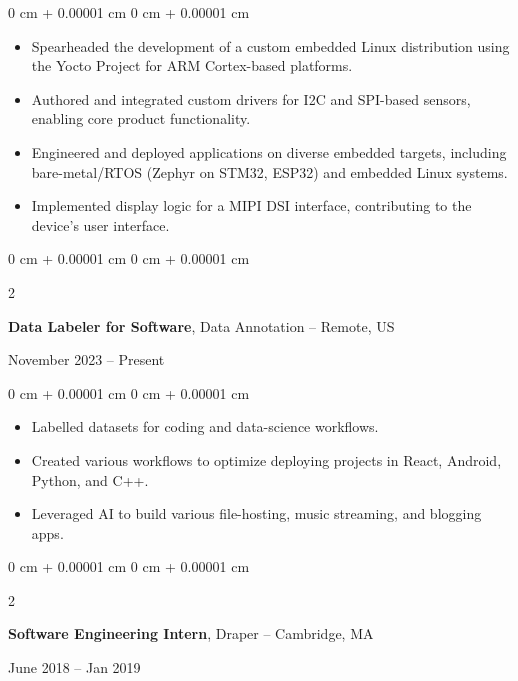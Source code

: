 \documentclass[10pt, letterpaper]{article}
\newenvironment{highlights}{
    \begin{itemize}[
        topsep=0.10 cm,
        parsep=0.10 cm,
        partopsep=0pt,
        itemsep=0pt,
        leftmargin=0 cm + 10pt
    ]
}{
    \end{itemize}
} %
\newenvironment{onecolentry}{
    \begin{adjustwidth}{
        0 cm + 0.00001 cm
    }{
        0 cm + 0.00001 cm
    }
}{
    \end{adjustwidth}
} %
\newenvironment{twocolentry}[2][]{
    \onecolentry
    \def\secondColumn{#2}
    \setcolumnwidth{\fill, 6.0 cm}
    \begin{paracol}{2}
}{
    \switchcolumn \raggedleft \secondColumn
    \end{paracol}
    \endonecolentry
} %
\begin{document}
        \vspace{0.10 cm}
        \begin{onecolentry}
            \begin{highlights}
                \item Spearheaded the development of a custom embedded Linux distribution using the Yocto Project for ARM Cortex-based platforms.
                \item Authored and integrated custom drivers for I2C and SPI-based sensors, enabling core product functionality.
                \item Engineered and deployed applications on diverse embedded targets, including bare-metal/RTOS (Zephyr on STM32, ESP32) and embedded Linux systems.
                \item Implemented display logic for a MIPI DSI interface, contributing to the device's user interface.
            \end{highlights}
        \end{onecolentry}
        
        \vspace{0.2 cm}

        \begin{twocolentry}{
            November 2023 – Present
        }
            \textbf{Data Labeler for Software}, Data Annotation -- Remote, US
        \end{twocolentry}

        \vspace{0.10 cm}
        \begin{onecolentry}
            \begin{highlights}
                \item Labelled datasets for coding and data-science workflows.
                \item Created various workflows to optimize deploying projects in React, Android, Python, and C++.
                \item Leveraged AI to build various file-hosting, music streaming, and blogging apps.
            \end{highlights}
        \end{onecolentry}

        \vspace{0.2 cm}

        \begin{twocolentry}{
            June 2018 – Jan 2019
        }
            \textbf{Software Engineering Intern}, Draper -- Cambridge, MA
        \end{twocolentry}
\end{document}
